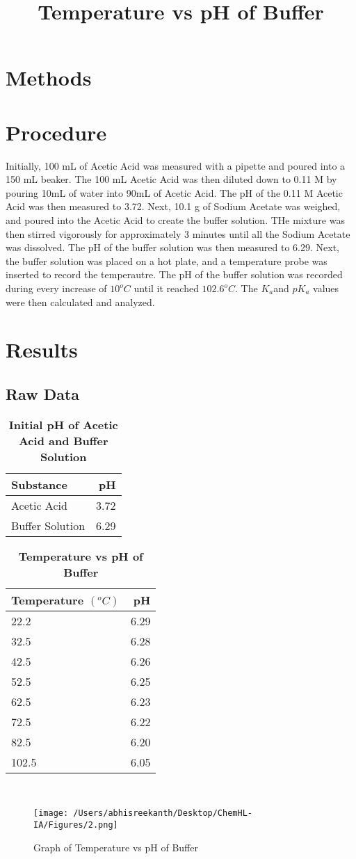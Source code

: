 \documentclass{article}
\begin{document}
\section*{Methods}%
\section*{Procedure} %
Initially, 100 mL of Acetic Acid was measured with a pipette and poured into a 150 mL beaker. The 100 mL Acetic Acid was then diluted down to 0.11 M by pouring 10mL of water into 90mL of Acetic Acid. The pH of the 0.11 M Acetic Acid was then measured to 3.72. Next, 10.1 g of Sodium Acetate was weighed, and poured into the Acetic Acid to create the buffer solution. THe mixture was then stirred vigorously for approximately 3 minutes until all the Sodium Acetate was dissolved. The pH of the buffer solution was then measured to 6.29. Next, the buffer solution was placed on a hot plate, and a temperature probe was inserted to record the temperautre. The pH of the buffer solution was recorded during every increase of $10^o C$ until it reached $102.6^o C$. The $K_a$and $pK_a$ values were then calculated and analyzed. 
\section*{Results} %
\subsection*{Raw Data} %
\begin{table}[H]
	\centering
	\caption*{\bf{Initial pH of Acetic Acid and Buffer Solution}}
	\begin{tabular}{l | r} \\
	Substance & pH \\ \hline
	Acetic Acid & 3.72 \\
	Buffer Solution & 6.29 \\
	\end{tabular}
\end{table} 
\begin{table}[H]
	\centering
	\title{Temperature vs pH of Buffer}
	\caption*{\bf{Temperature vs pH of Buffer}}
	\begin{tabular}{l | r} \\
	Temperature $(^oC)$ & pH \\ \hline
	22.2 & 6.29 \\ 
	32.5 & 6.28 \\
	42.5 & 6.26 \\
	52.5 & 6.25 \\
	62.5 & 6.23 \\
	72.5 & 6.22 \\
	82.5 & 6.20 \\
	102.5 & 6.05 \\
	\end{tabular} \\
\end{table} 
\begin{figure}[H]
	\centering 
	\texttt{[image: /Users/abhisreekanth/Desktop/ChemHL-IA/Figures/2.png]}
	\caption*{Graph of Temperature vs pH of Buffer}
\end{figure}
\end{document}
